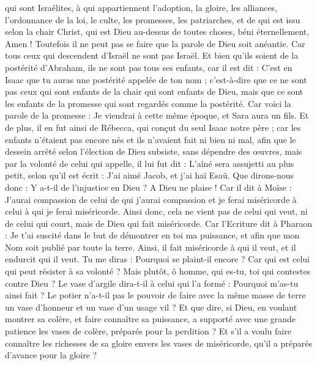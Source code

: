 \begin{multicols}{2}
qui sont Israélites, à qui appartiennent l'adoption, la gloire, les alliances, l'ordonnance de la loi, le culte,
les promesses, les patriarches, et de qui est issu selon la chair Christ, qui est Dieu au-dessus de toutes choses, béni éternellement, Amen !
Toutefois il ne peut pas se faire que la parole de Dieu soit anéantie. Car tous ceux qui descendent d’Israël ne sont pas Israël.
Et bien qu’ils soient de la postérité d'Abraham, ils ne sont pas tous ses enfants, car il est dit : C'est en Isaac que tu auras une postérité appelée de ton nom ;
c'est-à-dire que ce ne sont pas ceux qui sont enfants de la chair qui sont enfants de Dieu, mais que ce sont les enfants de la promesse qui sont regardés comme la postérité.
Car voici la parole de la promesse : Je viendrai à cette même époque, et Sara aura un fils.
Et de plus, il en fut ainsi de Rébecca, qui conçut du seul Isaac notre père ;
car les enfants n’étaient pas encore nés et ils n’avaient fait ni bien ni mal, afin que le dessein arrêté selon l'élection de Dieu subsiste, sans dépendre des œuvres, mais par la volonté de celui qui appelle,
il lui fut dit : L’aîné sera assujetti au plus petit, selon qu’il est écrit :
J'ai aimé Jacob, et j'ai haï Esaü.
Que dirons-nous donc : Y a-t-il de l’injustice en Dieu ? A Dieu ne plaise !
Car il dit à Moïse : J'aurai compassion de celui de qui j’aurai compassion et je ferai miséricorde à celui à qui je ferai miséricorde.
Ainsi donc, cela ne vient pas de celui qui veut, ni de celui qui court, mais de Dieu qui fait miséricorde.
Car l'Ecriture dit à Pharaon : Je t'ai suscité dans le but de démontrer en toi ma puissance, et afin que mon Nom soit publié par toute la terre.
Ainsi, il fait miséricorde à qui il veut, et il endurcit qui il veut.
Tu me diras : Pourquoi se plaint-il encore ? Car qui est celui qui peut résister à sa volonté ?
Mais plutôt, ô homme, qui es-tu, toi qui contestes contre Dieu ? Le vase d’argile dira-t-il à celui qui l'a formé : Pourquoi m'as-tu ainsi fait ?
Le potier n'a-t-il pas le pouvoir de faire avec la même masse de terre un vase d’honneur et un vase d’un usage vil ?
Et que dire, si Dieu, en voulant montrer sa colère, et faire connaître sa puissance, a supporté avec une grande patience les vases de colère, préparés pour la perdition ?
Et s’il a voulu faire connaître les richesses de sa gloire envers les vases de miséricorde, qu'il a préparés d’avance pour la gloire ?

\end{multicols}
